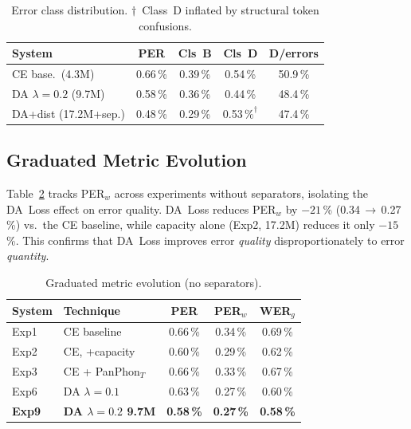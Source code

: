 \documentclass[conference]{IEEEtran}
\newcommand{\lam}{\lambda}                %
\begin{document}
\begin{table}[t]
  \caption{Error class distribution. $\dagger$~Class~D inflated by
           structural token confusions.}
  \label{tab:classdist}
  \centering\small
  \begin{tabular}{lcccc}
    \toprule
    System & PER & Cls~B & Cls~D & D/errors \\
    \midrule
    CE base.\ (4.3M)            & 0.66\,\% & 0.39\,\% & 0.54\,\% & 50.9\,\% \\
    DA $\lam\!=\!0.2$ (9.7M)    & 0.58\,\% & 0.36\,\% & 0.44\,\% & 48.4\,\% \\
    DA+dist (17.2M+sep.)        & 0.48\,\% & 0.29\,\% & 0.53\,$\%^\dagger$ & 47.4\,\% \\
    \bottomrule
  \end{tabular}
\end{table}

\subsection{Graduated Metric Evolution}

Table~\ref{tab:graduated} tracks PER$_w$ across experiments without
separators, isolating the DA~Loss effect on error quality.
DA~Loss reduces PER$_w$ by $-21$\,\% (0.34\,$\to$\,0.27\,\%) vs.\
the CE baseline, while capacity alone (Exp2, 17.2M) reduces it
only $-15$\,\%.
This confirms that DA~Loss improves error \emph{quality}
disproportionately to error \emph{quantity}.

\begin{table}[t]
  \caption{Graduated metric evolution (no separators).}
  \label{tab:graduated}
  \centering\small
  \begin{tabular}{llccc}
    \toprule
    System & Technique & PER & PER$_w$ & WER$_g$ \\
    \midrule
    Exp1 & CE baseline     & 0.66\,\% & 0.34\,\% & 0.69\,\% \\
    Exp2 & CE, +capacity   & 0.60\,\% & 0.29\,\% & 0.62\,\% \\
    Exp3 & CE + PanPhon$_T$& 0.66\,\% & 0.33\,\% & 0.67\,\% \\
    Exp6 & DA $\lam\!=\!0.1$ & 0.63\,\% & 0.27\,\% & 0.60\,\% \\
    \textbf{Exp9} & \textbf{DA $\lam\!=\!0.2$ 9.7M}
      & \textbf{0.58\,\%} & \textbf{0.27\,\%} & \textbf{0.58\,\%} \\
    \bottomrule
  \end{tabular}
\end{table}
\end{document}
